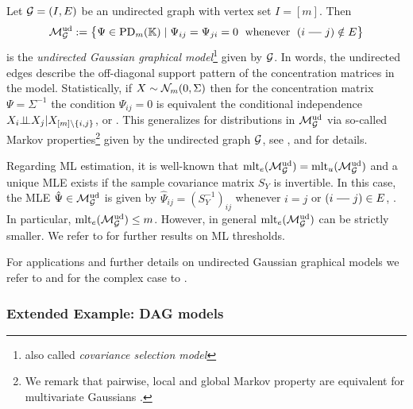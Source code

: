 \begin{example} \label{ex:UndirectedGraphicalModelIntro}
	Let $\mathcal{G} = (I,E)$ be an undirected graph with vertex set $I = [m]$. Then
		\[ \Mud_{\Gcal} := \big\{ \Psi  \in \PD_m(\KK) \mid \Psi_{ij} = \Psi_{ji} = 0 \;\text{ whenever }\;
		\begin{tikzcd}[cramped, sep=small]	(i \ar[r, no head] & j) \end{tikzcd}\notin E \big\}  \]
	is the \emph{undirected Gaussian graphical model}\footnote{also called \emph{covariance selection model}}
	given by $\mathcal{G}$.
	In words, the undirected edges describe the off-diagonal support pattern of the concentration matrices in the model.
	Statistically, if $X \sim \mathcal{N}_m(0,\Sigma)$ then for the concentration matrix $\Psi = \Sigma^{-1}$ the condition $\Psi_{ij} = 0$ is equivalent the conditional independence $X_i {\perp\!\!\!\perp} X_j | X_{[m]\backslash \{i,j\}}$, \cite[Proposition~5.2]{LauritzenBook} or \cite[Proposition~6.3.2]{SullivantBook}. This generalizes for distributions in $\mathcal{M}^{\mathrm{ud}}_{\mathcal{G}}$ via so-called Markov properties\footnote{We remark that pairwise, local and global Markov property are equivalent for multivariate Gaussians \cite[Section 13.1]{SullivantBook}.}
	given by the undirected graph $\mathcal{G}$, see \cite{LauritzenBook}, and \cite[Chapter~13]{SullivantBook} for details.
	
	Regarding ML estimation, it is well-known that $\operatorname{mlt}_e(\mathcal{M}^{\mathrm{ud}}_{\mathcal{G}}) = \operatorname{mlt}_u(\mathcal{M}^{\mathrm{ud}}_{\mathcal{G}})$ and a unique MLE exists if the sample covariance matrix $S_Y$ is invertible. In this case, the MLE $\hat{\Psi} \in \mathcal{M}^{\mathrm{ud}}_{\mathcal{G}}$ is given by $\hat{\Psi}_{ij} = (S_Y^{-1})_{ij}$ whenever $i=j$ or $\begin{tikzcd}[cramped, sep=small]	(i \ar[r, no head] & j) \end{tikzcd} \in E$, \cite[Theorem~5.3]{LauritzenBook}. In particular, $\operatorname{mlt}_e(\mathcal{M}^{\mathrm{ud}}_{\mathcal{G}}) \leq m$. However, in general $\operatorname{mlt}_e(\mathcal{M}^{\mathrm{ud}}_{\mathcal{G}})$ can be strictly smaller. We refer to \cite{blekherman2019maximum, buhl1993existence, gross2018maximum, uhler2012geometry} for further results on ML thresholds.
	
	For applications and further details on undirected Gaussian graphical models we refer to \cite{LauritzenBook, SullivantBook} and for the complex case to \cite{ComplexGraphicalModelsBook}.
	\hfill\exSymbol
\end{example}



\subsubsection{Extended Example: DAG models}

